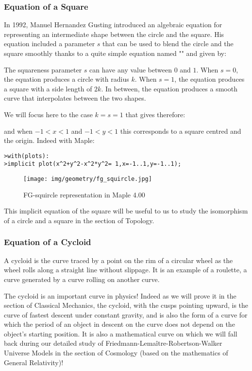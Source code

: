 	\subsubsection{Equation of a Square}
	In 1992, Manuel Hernandez Gusting introduced an algebraic equation for representing an intermediate shape between the circle and the square. His equation included a parameter $s$ that can be used to blend the circle and the square smoothly thanks to a quite simple equation named "\label{fg squircle}" and given by:
	
	The squareness parameter $s$ can have any value between $0$ and $1$. When $s = 0$, the equation produces a circle with radius $k$. When $s = 1$, the equation produces a square with a side length of $2k$. In between, the equation produces a smooth curve that interpolates between the two shapes.
	
	We will focus here to the case $k=s=1$ that gives therefore:
	
	and when $-1<x<1$ and $-1<y<1$ this corresponds to a square centred and the origin. Indeed with Maple:
	
	\texttt{>with(plots):\\
	>implicit plot(x\string^2+y\string^2-x\string^2*y\string^2= 1,x=-1..1,y=-1..1);
	}
	\begin{figure}[H]
		\centering
		\texttt{[image: img/geometry/fg\_squircle.jpg]}
		\caption{FG-squircle representation in Maple 4.00}
	\end{figure}

	This implicit equation of the square will be useful to us to study the isomorphism of a circle and a square in the section of Topology.
	
	\subsubsection{Equation of a Cycloid}\label{cycloid curve}
	A cycloid is the curve traced by a point on the rim of a circular wheel as the wheel rolls along a straight line without slippage. It is an example of a roulette, a curve generated by a curve rolling on another curve.

	The cycloid is an important curve in physics! Indeed as we will prove it in the section of Classical Mechanics, the cycloid, with the cusps pointing upward, is the curve of fastest descent under constant gravity, and is also the form of a curve for which the period of an object in descent on the curve does not depend on the object's starting position. It is also a mathematical curve on which we will fall back during our detailed study of Friedmann-Lemaître-Robertson-Walker Universe Models in the section of Cosmology (based on the mathematics of General Relativity)!

